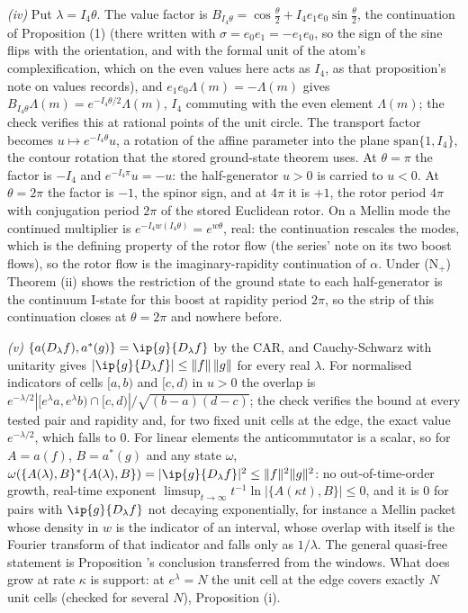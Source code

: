 \emph{(iv)} Put $\lambda = I_{4}\theta$. The value factor is $B_{I_{4}\theta} = \cos\tfrac{\theta}{2} + I_{4}e_{1}e_{0}\sin\tfrac{\theta}{2}$, the continuation of Proposition (1) (there written with $\sigma = e_{0}e_{1} = -e_{1}e_{0}$, so the sign of the sine flips with the orientation, and with the formal unit of the atom's complexification, which on the even values here acts as $I_{4}$, as that proposition's note on values records), and $e_{1}e_{0}\Lambda(m) = -\Lambda(m)$ gives $B_{I_{4}\theta}\Lambda(m) = e^{-I_{4}\theta/2}\Lambda(m)$, $I_{4}$ commuting with the even element $\Lambda(m)$; the check verifies this at rational points of the unit circle. The transport factor becomes $u \mapsto e^{-I_{4}\theta}u$, a rotation of the affine parameter into the plane $\mathrm{span}\{1, I_{4}\}$, the contour rotation that the stored ground-state theorem uses. At $\theta = \pi$ the factor is $-I_{4}$ and $e^{-I_{4}\pi}u = -u$: the half-generator $u > 0$ is carried to $u < 0$. At $\theta = 2\pi$ the factor is $-1$, the spinor sign, and at $4\pi$ it is $+1$, the rotor period $4\pi$ with conjugation period $2\pi$ of the stored Euclidean rotor. On a Mellin mode the continued multiplier is $e^{-I_{4}w(I_{4}\theta)} = e^{w\theta}$, real: the continuation rescales the modes, which is the defining property of the rotor flow (the series' note on its two boost flows), so the rotor flow is the imaginary-rapidity continuation of $\alpha$. Under (N$_{+}$) Theorem (ii) shows the restriction of the ground state to each half-generator is the continuum I-state for this boost at rapidity period $2\pi$, so the strip of this continuation closes at $\theta = 2\pi$ and nowhere before.

\emph{(v)} $\{a(D_{\lambda}f), a^{*}(g)\} = \ip{g}{D_{\lambda}f}$ by the CAR, and Cauchy-Schwarz with unitarity gives $|\ip{g}{D_{\lambda}f}| \le \|f\|\,\|g\|$ for every real $\lambda$. For normalised indicators of cells $[a, b)$ and $[c, d)$ in $u > 0$ the overlap is $e^{-\lambda/2}|[e^{\lambda}a, e^{\lambda}b)\cap[c, d)|/\sqrt{(b - a)(d - c)}$; the check verifies the bound at every tested pair and rapidity and, for two fixed unit cells at the edge, the exact value $e^{-\lambda/2}$, which falls to $0$. For linear elements the anticommutator is a scalar, so for $A = a(f)$, $B = a^{*}(g)$ and any state $\omega$, $\omega(\{A(\lambda), B\}^{*}\{A(\lambda), B\}) = |\ip{g}{D_{\lambda}f}|^{2} \le \|f\|^{2}\|g\|^{2}$: no out-of-time-order growth, real-time exponent $\limsup_{t\to\infty} t^{-1}\ln|\{A(\kappa t), B\}| \le 0$, and it is $0$ for pairs with $\ip{g}{D_{\lambda}f}$ not decaying exponentially, for instance a Mellin packet whose density in $w$ is the indicator of an interval, whose overlap with itself is the Fourier transform of that indicator and falls only as $1/\lambda$. The general quasi-free statement is Proposition 's conclusion transferred from the windows. What does grow at rate $\kappa$ is support: at $e^{\lambda} = N$ the unit cell at the edge covers exactly $N$ unit cells (checked for several $N$), Proposition (i).

